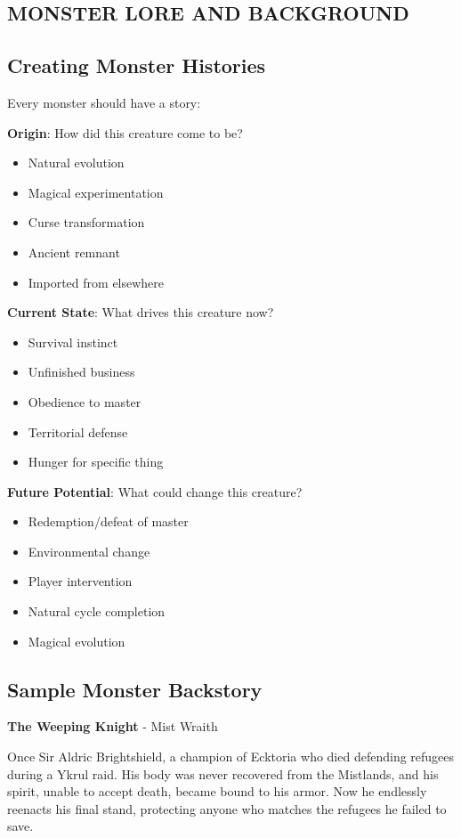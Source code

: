 \documentclass[12pt]{article}
\begin{document}
\begin{itemize}
\section{MONSTER LORE AND BACKGROUND}

\subsection*{Creating Monster Histories}

Every monster should have a story:

\textbf{Origin}: How did this creature come to be?
\begin{itemize}
\item Natural evolution
\item Magical experimentation
\item Curse transformation
\item Ancient remnant
\item Imported from elsewhere
\end{itemize}

\textbf{Current State}: What drives this creature now?
\begin{itemize}
\item Survival instinct
\item Unfinished business
\item Obedience to master
\item Territorial defense
\item Hunger for specific thing
\end{itemize}

\textbf{Future Potential}: What could change this creature?
\begin{itemize}
\item Redemption/defeat of master
\item Environmental change
\item Player intervention
\item Natural cycle completion
\item Magical evolution
\end{itemize}

\subsection*{Sample Monster Backstory}

\textbf{The Weeping Knight} - Mist Wraith

Once Sir Aldric Brightshield, a champion of Ecktoria who died defending refugees during a Ykrul raid. His body was never recovered from the Mistlands, and his spirit, unable to accept death, became bound to his armor. Now he endlessly reenacts his final stand, protecting anyone who matches the refugees he failed to save.


\end{itemize}
\end{document}
